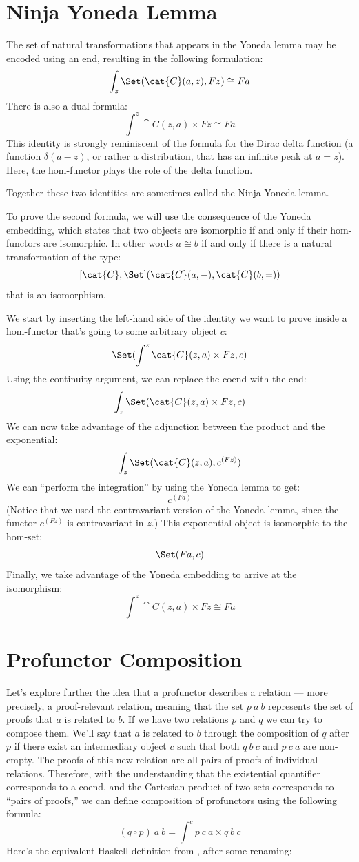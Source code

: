 \section{Ninja Yoneda Lemma}

The set of natural transformations that appears in the Yoneda lemma may
be encoded using an end, resulting in the following formulation:
\[\int_z \Set(\cat{C}(a, z), F z) \cong F a\]
There is also a dual formula:
\[\int^z \cat{C}(z, a)\times{}F z \cong F a\]
This identity is strongly reminiscent of the formula for the Dirac delta
function (a function $\delta(a - z)$, or rather a distribution, that
has an infinite peak at $a = z$). Here, the hom-functor plays
the role of the delta function.

Together these two identities are sometimes called the Ninja Yoneda
lemma.

To prove the second formula, we will use the consequence of the Yoneda
embedding, which states that two objects are isomorphic if and only if
their hom-functors are isomorphic. In other words $a \cong b$ if
and only if there is a natural transformation of the type:
\[[\cat{C}, \Set](\cat{C}(a, -), \cat{C}(b, =))\]
that is an isomorphism.

We start by inserting the left-hand side of the identity we want to
prove inside a hom-functor that's going to some arbitrary object
$c$:
\[\Set(\int^z \cat{C}(z, a)\times{}F z, c)\]
Using the continuity argument, we can replace the coend with the end:
\[\int_z \Set(\cat{C}(z, a)\times{}F z, c)\]
We can now take advantage of the adjunction between the product and the
exponential:
\[\int_z \Set(\cat{C}(z, a), c^{(F z)})\]
We can ``perform the integration'' by using the Yoneda lemma to get:
\[c^{(F a)}\]
(Notice that we used the contravariant version of the Yoneda lemma,
since the functor $c^{(F z)}$ is contravariant in $z$.)
This exponential object is isomorphic to the hom-set:
\[\Set(F a, c)\]
Finally, we take advantage of the Yoneda embedding to arrive at the
isomorphism:
\[\int^z \cat{C}(z, a)\times{}F z \cong F a\]

\section{Profunctor Composition}

Let's explore further the idea that a profunctor describes a relation
--- more precisely, a proof-relevant relation, meaning that the set
$p\ a\ b$ represents the set of proofs that $a$ is related
to $b$. If we have two relations $p$ and $q$ we can
try to compose them. We'll say that $a$ is related to $b$
through the composition of $q$ after $p$ if there exist an
intermediary object $c$ such that both $q\ b\ c$ and
$p\ c\ a$ are non-empty. The proofs of this new relation are all
pairs of proofs of individual relations. Therefore, with the
understanding that the existential quantifier corresponds to a coend,
and the Cartesian product of two sets corresponds to ``pairs of
proofs,'' we can define composition of profunctors using the following
formula:
\[(q \circ p)\ a\ b = \int^c p\ c\ a\times{}q\ b\ c\]
Here's the equivalent Haskell definition from
, after some renaming:


